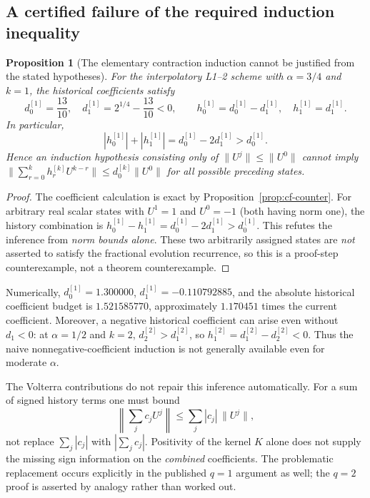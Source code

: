 \documentclass[11pt,a4paper]{amsart}
\theoremstyle{remark}
\theoremstyle{plain}
\newtheorem{proposition}{Proposition}[section]
\theoremstyle{remark}
\numberwithin{equation}{section}
\begin{document}
\subsection{A certified failure of the required induction inequality}
\begin{proposition}[The elementary contraction induction cannot be justified from the stated hypotheses]
\label{prop:st-history-counter}
For the interpolatory L1--2 scheme with $\alpha=3/4$ and $k=1$, the historical coefficients satisfy
\[
 d_0^{[1]}=\frac{13}{10},\quad
 d_1^{[1]}=2^{1/4}-\frac{13}{10}<0,
 \qquad h_0^{[1]}=d_0^{[1]}-d_1^{[1]},\quad h_1^{[1]}=d_1^{[1]}.
\]
In particular,
\begin{equation}\label{eq:st-absolute}
 |h_0^{[1]}|+|h_1^{[1]}|
 =d_0^{[1]}-2d_1^{[1]}>d_0^{[1]}.
\end{equation}
Hence an induction hypothesis consisting only of $\|U^j\|\leq\|U^0\|$ cannot imply
\(\|\sum_{r=0}^k h_r^{[k]}U^{k-r}\|
\leq d_0^{[k]}\|U^0\|\) for all possible preceding states.
\end{proposition}
\begin{proof}
The coefficient calculation is exact by Proposition~\ref{prop:cf-counter}. For arbitrary real scalar states with $U^1=1$ and $U^0=-1$ (both having norm one), the history combination is $h_0^{[1]}-h_1^{[1]}=d_0^{[1]}-2d_1^{[1]}>d_0^{[1]}$. This refutes the inference from \emph{norm bounds alone}. These two arbitrarily assigned states are \emph{not} asserted to satisfy the fractional evolution recurrence, so this is a proof-step counterexample, not a theorem counterexample.
\end{proof}

Numerically, $d_0^{[1]}=1.300000$, $d_1^{[1]}=-0.110792885$, and the absolute historical coefficient budget is $1.521585770$, approximately $1.170451$ times the current coefficient. Moreover, a negative historical coefficient can arise even without $d_1<0$: at $\alpha=1/2$ and $k=2$, $d_2^{[2]}>d_1^{[2]}$, so $h_1^{[2]}=d_1^{[2]}-d_2^{[2]}<0$. Thus the naive nonnegative-coefficient induction is not generally available even for moderate $\alpha$.

The Volterra contributions do not repair this inference automatically. For a sum of signed history terms one must bound
\[
 \left\|\sum_j c_j U^j\right\|\leq\sum_j|c_j|\,\|U^j\|,
\]
not replace $\sum_j|c_j|$ with $|\sum_j c_j|$. Positivity of the kernel $K$ alone does not supply the missing sign information on the \emph{combined} coefficients. The problematic replacement occurs explicitly in the published $q=1$ argument as well; the $q=2$ proof is asserted by analogy rather than worked out.
\end{document}
